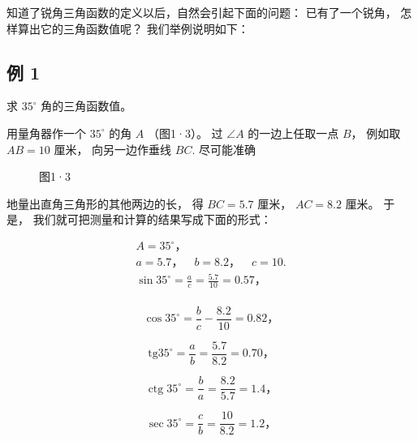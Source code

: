 知道了锐角三角函数的定义以后，自然会引起下面的问题： 已有了一个锐角，
怎样算出它的三角函数值呢？ 我们举例说明如下：

\subsection{例 1}

求 \(35^{\circ}\) 角的三角函数值。

 用量角器作一个 \(35^{\circ}\) 的角 \(A\) （图1·3）。 过
\(\angle A\) 的一边上任取一点 \(B\)， 例如取 \(AB = 10\) 厘米，
向另一边作垂线 \(BC\). 尽可能准确

\begin{figure}
\centering
{}
\caption{图1·3}
\end{figure}


地量出直角三角形的其他两边的长， 得 \(BC = 5.7\) 厘米， \(AC = 8.2\)
厘米。 于是， 我们就可把测量和计算的结果写成下面的形式：

\[
\begin{array}{l} A = 35 ^{\circ}\text{，} \\ a = 5.7\text{，} \quad b = 8.2\text{，} \quad c = 10. \\ \sin 35 ^{\circ} = \frac {a}{c} = \frac {5.7}{10} = 0.57\text{，} \\ \end{array}
\]

\[
\cos 35 ^{\circ} = \frac {b}{c} - \frac {8.2}{10} = 0.82\text{，}
\]

\[
\mathrm{tg} 35 ^{\circ} = \frac {a}{b} = \frac {5.7}{8.2} = 0.70\text{，}
\]

\[
\operatorname{ctg} 35^{\circ}=\frac{b}{a}=\frac{8.2}{5.7}=1.4\text{，}
\]

\[
\sec 35 ^{\circ} = \frac {c}{b} = \frac {10}{8.2} = 1.2\text{，}
\]

